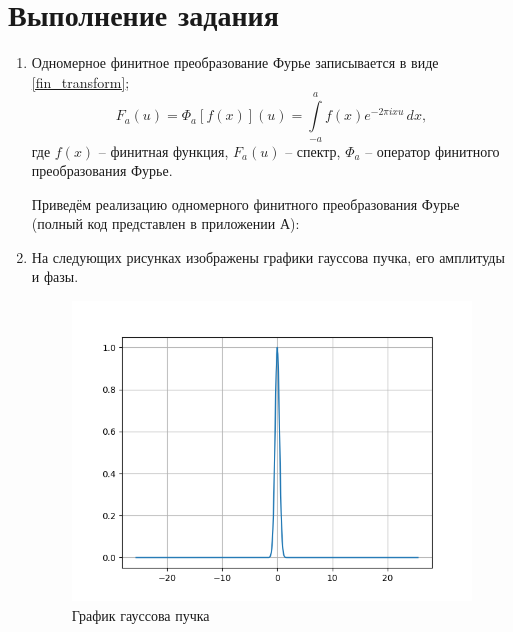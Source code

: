 \section*{Выполнение задания}
{
	\begin{enumerate}
		\item {
			Одномерное финитное преобразование Фурье записывается в виде \eqref{fin_transform};
			\begin{equation}\label{fin_transform}
			F_a(u) = \Phi_a \left[ f(x) \right] (u) = \int\limits_{-a}^{a} f(x) e^{-2 \pi i x u} \,dx,
			\end{equation}
			где $f(x)$ -- финитная функция, $F_a(u)$ -- спектр, $\Phi_a$ -- оператор финитного преобразования Фурье.
			
			Приведём реализацию одномерного финитного преобразования Фурье (полный код представлен в приложении А):
			
		}
		
		\item {
			На следующих рисунках изображены графики гауссова пучка, его амплитуды и фазы.
			
			\begin{figure}[H]
				\begin{center}
				\includegraphics[scale=0.7]{Just_gauss}
				\caption{График гауссова пучка}
				\label{gauss}
			\end{center}
			\end{figure}
			
}
\end{enumerate}}
